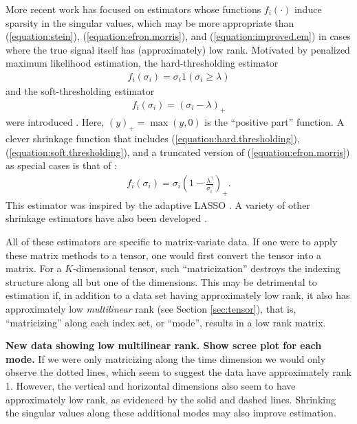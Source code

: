 More recent work has focused on estimators whose functions
$f_i(\cdot)$ induce sparsity in the singular values, which may be more
appropriate than (\ref{equation:stein}),
(\ref{equation:efron.morris}), and (\ref{equation:improved.em}) in
cases where the true signal itself has (approximately) low
rank. Motivated by penalized maximum likelihood estimation, the
hard-thresholding estimator
\begin{align}
  \label{equation:hard.thresholding}
  f_i(\sigma_i) = \sigma_i 1(\sigma_i \geq \lambda)
\end{align}
and the soft-thresholding estimator
\begin{align}
  \label{equation:soft.thresholding}
  f_i(\sigma_i) = (\sigma_i - \lambda)_+
\end{align}
were introduced \citep[for example]{candes2013unbiased}. Here, $(y)_+
= \max(y,0)$ is the ``positive part'' function. A clever shrinkage
function that includes (\ref{equation:hard.thresholding}),
(\ref{equation:soft.thresholding}), and a truncated version of
(\ref{equation:efron.morris}) \citep{verbanck2015regularised} as
special cases is that of \cite{josse2015adaptive}:
\begin{align}
  \label{equation:josse.sardy.est}
  f_i(\sigma_i) = \sigma_i\left(1 - \frac{\lambda^{\gamma}}{\sigma_i^{\gamma}}\right)_+.
\end{align}
This estimator was inspired by the adaptive LASSO
\citep{zou2006adaptive}. A variety of other shrinkage estimators have
also been developed
\citep{nadakuditi2014optshrink,shabalin2013reconstruction}.

All of these estimators are specific to matrix-variate data. If one
were to apply these matrix methods to a tensor, one would first
convert the tensor into a matrix. For a $K$-dimensional tensor, such
``matricization'' destroys the indexing structure along all but one of
the dimensions. This may be detrimental to estimation if, in addition
to a data set having approximately low rank, it also has approximately
low \emph{multilinear} rank (see Section \ref{sec:tensor}), that is,
``matricizing'' along each index set, or ``mode'', results in a low
rank matrix.

\textbf{New data showing low multilinear rank. Show scree plot for
  each mode.} If we were only matricizing along the time dimension we
would only observe the dotted lines, which seem to suggest the data
have approximately rank 1. However, the vertical and horizontal
dimensions also seem to have approximately low rank, as evidenced by
the solid and dashed lines. Shrinking the singular values along these
additional modes may also improve estimation.

